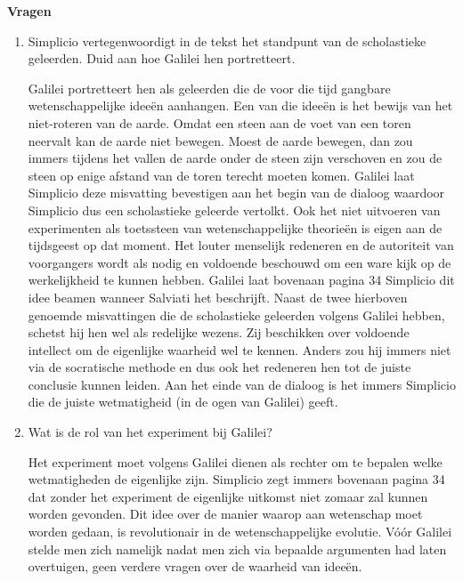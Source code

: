 \newpage

\textbf{Vragen}

\begin{enumerate}
\item Simplicio vertegenwoordigt in de tekst het standpunt van de scholastieke geleerden. Duid aan hoe Galilei hen portretteert.
\begin{oplossing}
\newline
Galilei portretteert hen als geleerden die de voor die tijd gangbare wetenschappelijke idee\"en aanhangen. 
\newline
Een van die idee\"en is het bewijs van het niet-roteren van de aarde. Omdat een steen aan de voet van een toren neervalt kan de aarde niet bewegen. Moest de aarde bewegen, dan zou immers tijdens het vallen de aarde onder de steen zijn verschoven en zou de steen op enige afstand van de toren terecht moeten komen. Galilei laat Simplicio deze misvatting bevestigen aan het begin van de dialoog waardoor Simplicio dus een scholastieke geleerde vertolkt.
\newline
Ook het niet uitvoeren van experimenten als toetssteen van wetenschappelijke theorie\"en is eigen aan de tijdsgeest op dat moment. Het louter menselijk redeneren en de autoriteit van voorgangers wordt als nodig en voldoende beschouwd om een ware kijk op de werkelijkheid te kunnen hebben. Galilei laat bovenaan pagina 34 Simplicio dit idee beamen wanneer Salviati het beschrijft.
\newline
Naast de twee hierboven genoemde misvattingen die de scholastieke geleerden volgens Galilei hebben, schetst hij hen wel als redelijke wezens. Zij beschikken over voldoende intellect om de eigenlijke waarheid wel te kennen. Anders zou hij immers niet via de socratische methode en dus ook het redeneren hen tot de juiste conclusie kunnen leiden. Aan het einde van de dialoog is het immers Simplicio die de juiste wetmatigheid (in de ogen van Galilei) geeft.
\end{oplossing}

\item Wat is de rol van het experiment bij Galilei?
\begin{oplossing}
\newline
Het experiment moet volgens Galilei dienen als rechter om te bepalen welke wetmatigheden de eigenlijke zijn. Simplicio zegt immers bovenaan pagina 34 dat zonder het experiment de eigenlijke uitkomst niet zomaar zal kunnen worden gevonden. Dit idee over de manier waarop aan wetenschap moet worden gedaan, is revolutionair in de wetenschappelijke evolutie. V\'o\'or Galilei stelde men zich namelijk nadat men zich via bepaalde argumenten had laten overtuigen, geen verdere vragen over de waarheid van idee\"en. 
\end{oplossing}


\end{enumerate}
